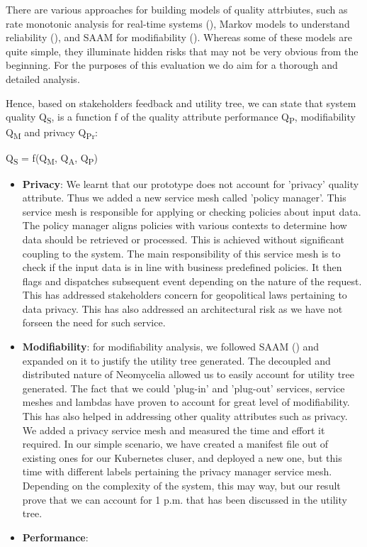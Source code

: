\documentclass[conference]{IEEEtran}
\begin{document}
There are various approaches for building models of quality attrbiutes, such as rate monotonic analysis for real-time systems (\cite{klein1993guide}), Markov models to understand reliability (\cite{iannino1994software}), and SAAM for modifiability (\cite{kazman1994saam}). Whereas some of these models are quite simple, they illuminate hidden risks that may not be very obvious from the beginning. For the purposes of this evaluation we do aim for a thorough and detailed analysis.

Hence, based on stakeholders feedback and utility tree, we can state that system quality Q\textsubscript{S}, is a function f of the quality attribute performance Q\textsubscript{P}, modifiability Q\textsubscript{M} and privacy Q\textsubscript{Pr}:

\hfill \break
Q\textsubscript{S} = f(Q\textsubscript{M}, Q\textsubscript{A}, Q\textsubscript{P})
 \hfill \break


\begin{itemize}
    \item \textbf{Privacy}: We learnt that our prototype does not account for 'privacy' quality attribute. Thus we added a new service mesh called 'policy manager'. This service mesh is responsible for applying or checking policies about input data. The policy manager aligns policies with various contexts to determine how data should be retrieved or processed. This is achieved without significant coupling to the system. The main responsibility of this service mesh is to check if the input data is in line with business predefined policies. It then flags and dispatches subsequent event depending on the nature of the request. This has addressed stakeholders concern for geopolitical laws pertaining to data privacy. This has also addressed an architectural risk as we have not forseen the need for such service. 
    \item \textbf{Modifiability}: for modifiability analysis, we followed SAAM (\cite{kazman1994saam}) and expanded on it to justify the utility tree generated. The decoupled and distributed nature of Neomycelia allowed us to easily account for utility tree generated. The fact that we could 'plug-in' and 'plug-out' services, service meshes and lambdas have proven to account for great level of modifiability. This has also helped in addressing other quality attributes such as privacy. We added a privacy service mesh and measured the time and effort it required. In our simple scenario, we have created a manifest file out of existing ones for our Kubernetes cluser, and deployed a new one, but this time with different labels pertaining the privacy manager service mesh. Depending on the complexity of the system, this may way, but our result prove that we can account for 1 p.m. that has been discussed in the utility tree. 
    \item \textbf{Performance}: 
\end{itemize}
\end{document}
